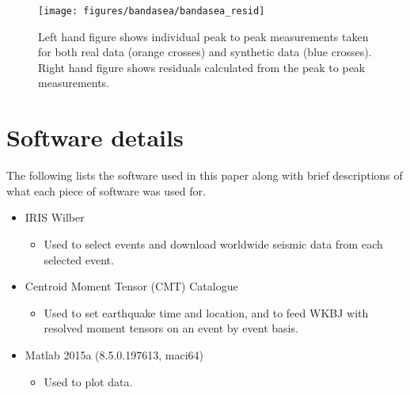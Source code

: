 \documentclass[11pt,a4paper]{article}
\begin{document}
\begin{figure}
	\centering
	\texttt{[image: figures/bandasea/bandasea\_resid]}
	\caption{Left hand figure shows individual peak to peak measurements taken for both real data (orange crosses) and synthetic data (blue crosses). Right hand figure shows residuals calculated from the peak to peak measurements.}
	\label{fig:Bandasea residuals}
\end{figure}

\appendix
\section{Software details}
\label{app:Software}
The following lists the software used in this paper along with brief descriptions of what each piece of software was used for.
\begin{itemize}
	\item IRIS Wilber
	\begin{itemize}
		\item Used to select events and download worldwide seismic data from each selected event.
	\end{itemize}
	\item Centroid Moment Tensor (CMT) Catalogue
	\begin{itemize}
		\item Used to set earthquake time and location, and to feed WKBJ with resolved moment tensors on an event by event basis.
	\end{itemize}
	\item Matlab 2015a (8.5.0.197613, maci64)
	\begin{itemize}
		\item Used to plot data.
	\end{itemize}
\end{itemize}

\newpage


\end{document}
